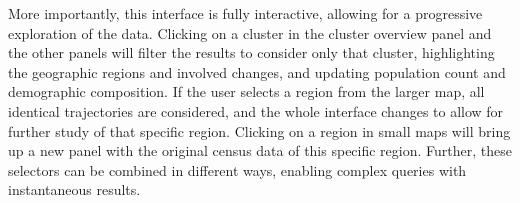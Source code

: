 More importantly, this interface is fully interactive, allowing for a
progressive exploration of the data. Clicking on a cluster in the cluster
overview panel and the other panels will filter the results to consider only
that cluster, highlighting the geographic regions and involved changes, and
updating population count and demographic composition. If the user selects a
region from the larger map, all identical trajectories are considered, and the
whole interface changes to allow for further study of that specific region.
Clicking on a region in small maps will bring up a new panel with the original
census data of this specific region. Further, these selectors can be combined in
different ways, enabling complex queries with instantaneous results.
